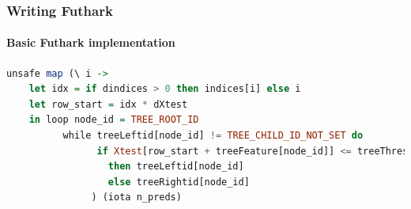 \documentclass[12pt,t]{beamer}
\begin{document}
\begin{frame}[fragile]
  \frametitle{Writing Futhark}
  \framesubtitle{Basic Futhark implementation}
  \begin{minipage}{\textwidth}
  \begin{lstlisting}[basicstyle=\tiny, language=Haskell, breaklines]
    unsafe map (\ i ->
    let idx = if dindices > 0 then indices[i] else i
    let row_start = idx * dXtest
    in loop node_id = TREE_ROOT_ID
          while treeLeftid[node_id] != TREE_CHILD_ID_NOT_SET do
                if Xtest[row_start + treeFeature[node_id]] <= treeThres_or_leaf[node_id]
                  then treeLeftid[node_id]
                  else treeRightid[node_id]
               ) (iota n_preds)
  \end{lstlisting}
  \end{minipage}
%
%
%
%
%

\end{frame}
\end{document}

